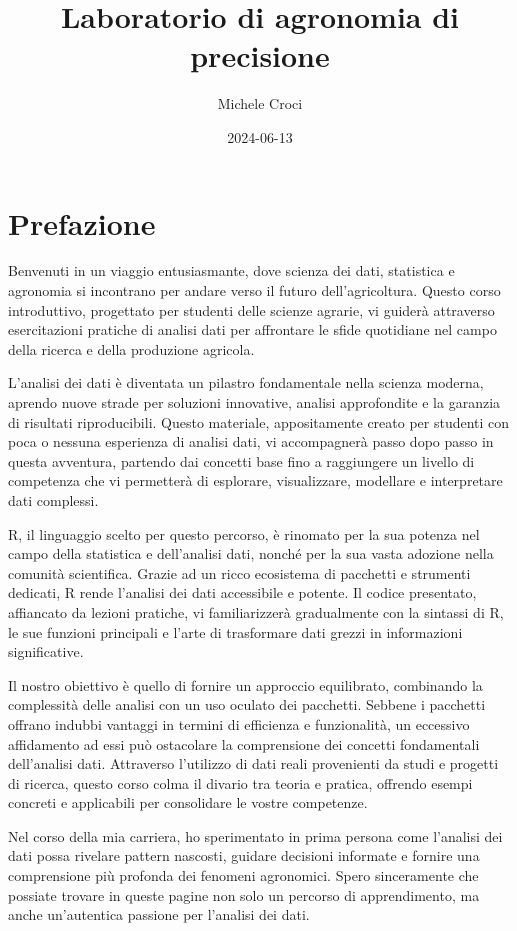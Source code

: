 \documentclass[
]{book}
\title{Laboratorio di agronomia di precisione}
\author{Michele Croci}
\date{2024-06-13}
\begin{document}
\frontmatter
\maketitle

\mainmatter
\hypertarget{prefazione}{%
\chapter{Prefazione}\label{prefazione}}

Benvenuti in un viaggio entusiasmante, dove scienza dei dati, statistica
e agronomia si incontrano per andare verso il futuro dell'agricoltura.
Questo corso introduttivo, progettato per studenti delle scienze
agrarie, vi guiderà attraverso esercitazioni pratiche di analisi dati
per affrontare le sfide quotidiane nel campo della ricerca e della
produzione agricola.

L'analisi dei dati è diventata un pilastro fondamentale nella scienza
moderna, aprendo nuove strade per soluzioni innovative, analisi
approfondite e la garanzia di risultati riproducibili. Questo materiale,
appositamente creato per studenti con poca o nessuna esperienza di
analisi dati, vi accompagnerà passo dopo passo in questa avventura,
partendo dai concetti base fino a raggiungere un livello di competenza
che vi permetterà di esplorare, visualizzare, modellare e interpretare
dati complessi.

R, il linguaggio scelto per questo percorso, è rinomato per la sua
potenza nel campo della statistica e dell'analisi dati, nonché per la
sua vasta adozione nella comunità scientifica. Grazie ad un ricco
ecosistema di pacchetti e strumenti dedicati, R rende l'analisi dei dati
accessibile e potente. Il codice presentato, affiancato da lezioni
pratiche, vi familiarizzerà gradualmente con la sintassi di R, le sue
funzioni principali e l'arte di trasformare dati grezzi in informazioni
significative.

Il nostro obiettivo è quello di fornire un approccio equilibrato,
combinando la complessità delle analisi con un uso oculato dei
pacchetti. Sebbene i pacchetti offrano indubbi vantaggi in termini di
efficienza e funzionalità, un eccessivo affidamento ad essi può
ostacolare la comprensione dei concetti fondamentali dell'analisi dati.
Attraverso l'utilizzo di dati reali provenienti da studi e progetti di
ricerca, questo corso colma il divario tra teoria e pratica, offrendo
esempi concreti e applicabili per consolidare le vostre competenze.

Nel corso della mia carriera, ho sperimentato in prima persona come
l'analisi dei dati possa rivelare pattern nascosti, guidare decisioni
informate e fornire una comprensione più profonda dei fenomeni
agronomici. Spero sinceramente che possiate trovare in queste pagine non
solo un percorso di apprendimento, ma anche un'autentica passione per
l'analisi dei dati.
\end{document}
